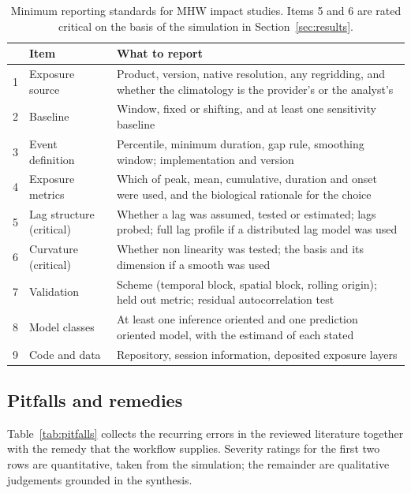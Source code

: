 \begin{table}[H]
\centering
\caption{Minimum reporting standards for MHW impact studies. Items 5 and 6 are rated critical on the basis of the simulation in Section~\ref{sec:results}.}
\label{tab:reporting}
\small
\begin{tabular}{clp{9.2cm}}
\toprule
 & Item & What to report \\
\midrule
1 & Exposure source & Product, version, native resolution, any regridding, and whether the climatology is the provider's or the analyst's \\
2 & Baseline & Window, fixed or shifting, and at least one sensitivity baseline \\
3 & Event definition & Percentile, minimum duration, gap rule, smoothing window; implementation and version \\
4 & Exposure metrics & Which of peak, mean, cumulative, duration and onset were used, and the biological rationale for the choice \\
5 & Lag structure (critical) & Whether a lag was assumed, tested or estimated; lags probed; full lag profile if a distributed lag model was used \\
6 & Curvature (critical) & Whether non linearity was tested; the basis and its dimension if a smooth was used \\
7 & Validation & Scheme (temporal block, spatial block, rolling origin); held out metric; residual autocorrelation test \\
8 & Model classes & At least one inference oriented and one prediction oriented model, with the estimand of each stated \\
9 & Code and data & Repository, session information, deposited exposure layers \\
\bottomrule
\end{tabular}
\end{table}

\subsection{Pitfalls and remedies}\label{sec:pitfalls}

Table~\ref{tab:pitfalls} collects the recurring errors in the reviewed literature together with the remedy that the workflow supplies. Severity ratings for the first two rows are quantitative, taken from the simulation; the remainder are qualitative judgements grounded in the synthesis.

